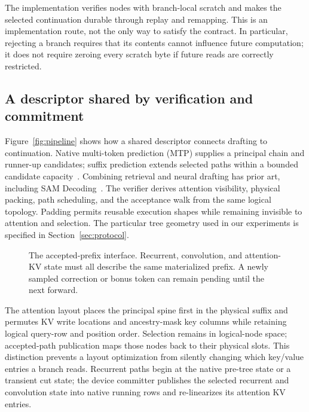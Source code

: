 \documentclass[conference]{IEEEtran}
\begin{document}
The implementation verifies nodes with branch-local scratch and makes the selected continuation durable through replay and remapping. This is an implementation route, not the only way to satisfy the contract. In particular, rejecting a branch requires that its contents cannot influence future computation; it does not require zeroing every scratch byte if future reads are correctly restricted.

\subsection{A descriptor shared by verification and commitment}
Figure~\ref{fig:pipeline} shows how a shared descriptor connects drafting to continuation. Native multi-token prediction (MTP) supplies a principal chain and runner-up candidates; suffix prediction extends selected paths within a bounded candidate capacity~\cite{oliaro2025suffix,arctic2026suffix}. Combining retrieval and neural drafting has prior art, including SAM Decoding~\cite{hu2024sam}. The verifier derives attention visibility, physical packing, path scheduling, and the acceptance walk from the same logical topology. Padding permits reusable execution shapes while remaining invisible to attention and selection. The particular tree geometry used in our experiments is specified in Section~\ref{sec:protocol}.

\begin{figure}[t]
\centering

\caption{The accepted-prefix interface. Recurrent, convolution, and attention-KV state must all describe the same materialized prefix. A newly sampled correction or bonus token can remain pending until the next forward.}
\label{fig:contract}
\end{figure}

The attention layout places the principal spine first in the physical suffix and permutes KV write locations and ancestry-mask key columns while retaining logical query-row and position order. Selection remains in logical-node space; accepted-path publication maps those nodes back to their physical slots. This distinction prevents a layout optimization from silently changing which key/value entries a branch reads. Recurrent paths begin at the native pre-tree state or a transient cut state; the device committer publishes the selected recurrent and convolution state into native running rows and re-linearizes its attention KV entries.
\end{document}
